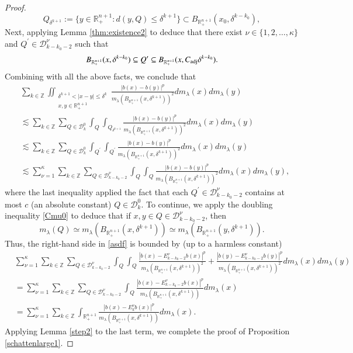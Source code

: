 \documentclass[12pt]{amsart}
\begin{document}
\begin{proof}
$$Q_{\delta^{k+1}}:=\{y\in\mathbb{R}_+^{n+1}:d(y,Q)\leq \delta^{k+1}\}\subset B_{\mathbb{R}_+^{n+1}}(x_0,\delta^{k-k_0}),$$
Next, applying Lemma \ref{thm:existence2} to deduce that there exist $\nu \in \{1, 2, \ldots, \kappa\}$ and
$Q^{\prime}\in\mathcal{D}_{k-k_0-2}^\nu$  such that
\begin{equation}\label{eq:ball;included}
    B_{\mathbb{R}_+^{n+1}}(x,\delta^{k-k_0})\subseteq Q^{\prime}\subseteq B_{\mathbb{R}_+^{n+1}}(x,C_{\rm adj}\delta^{k-k_0}).
\end{equation}
Combining with all the above facts, we conclude that
\begin{align}\label{asdf}
&\sum_{k\in\mathbb{Z}}\iint_{\substack{\delta^{k+1}<|x-y|\leq \delta^{k}\\x,y\in\mathbb{R}_{+}^{n+1}}}\frac{|b(x)-b(y)|^{p}}{m_\lambda(B_{\mathbb{R}_+^{n+1}}(x,\delta^{k+1}))^{2}}dm_\lambda(x)dm_\lambda(y)\nonumber\\
&\lesssim \sum_{k\in\mathbb{Z}}\sum_{Q\in\mathcal{D}_{k}^{0}}\int_Q\int_{Q_{\delta^{k+1}}}\frac{|b(x)-b(y)|^{p}}{m_\lambda(B_{\mathbb{R}_+^{n+1}}(x,\delta^{k+1}))^{2}}dm_\lambda(x)dm_\lambda(y)\nonumber\\
&\lesssim \sum_{k\in\mathbb{Z}}\sum_{Q\in\mathcal{D}_{k}^{0}}\int_{Q^\prime}\int_{Q^\prime}\frac{|b(x)-b(y)|^{p}}{m_\lambda(B_{\mathbb{R}_+^{n+1}}(x,\delta^{k+1}))^{2}}dm_\lambda(x)dm_\lambda(y)\nonumber\\
&\lesssim \sum_{\nu=1}^{\kappa} \sum_{k\in\mathbb{Z}}\sum_{Q\in\mathcal{D}_{k-k_0-2}^{\nu}}\int_{Q}\int_{Q}\frac{|b(x)-b(y)|^{p}}{m_\lambda(B_{\mathbb{R}_+^{n+1}}(x,\delta^{k+1}))^{2}}dm_\lambda(x)dm_\lambda(y),
\end{align}
where the last inequality applied the fact that each $Q^{\prime}\in \mathcal{D}_{k-k_0-2}^{\nu}$ contains at most $c$ (an absolute constant) $Q\in\mathcal{D}_{k}^{0}$.
To continue,  we apply the doubling inequality \eqref{Cmu0} to deduce that if $x,y\in Q\in\mathcal{D}_{k-k_0-2}^{\nu}$, then
$$m_\lambda(Q)\simeq m_\lambda(B_{\mathbb{R}_+^{n+1}}(x,\delta^{k+1}))\simeq m_\lambda(B_{\mathbb{R}_+^{n+1}}(y,\delta^{k+1})).$$
Thus,
 the right-hand side in \eqref{asdf} is bounded by (up to a harmless constant)
\begin{align*}
&\sum_{\nu=1}^{\kappa} \sum_{k\in\mathbb{Z}}\sum_{Q\in\mathcal{D}_{k-k_0-2}^{\nu}}\int_{Q}\int_{Q}\frac{|b(x)-E_{k-k_{0}-2}^{\nu}b(x)|^{p}}{m_\lambda(B_{\mathbb{R}_+^{n+1}}(x,\delta^{k+1}))^{2}}+\frac{|b(y)-E_{k-k_{0}-2}^{\nu}b(y)|^{p}}{m_\lambda(B_{\mathbb{R}_+^{n+1}}(x,\delta^{k+1}))^{2}}dm_\lambda(x)dm_\lambda(y)\\
&=\sum_{\nu=1}^{\kappa} \sum_{k\in\mathbb{Z}}\sum_{Q\in\mathcal{D}_{k-k_0-2}^{\nu}}\int_{Q}\frac{|b(x)-E_{k-k_{0}-2}^{\nu}b(x)|^{p}}{m_\lambda(B_{\mathbb{R}_+^{n+1}}(x,\delta^{k+1}))}dm_\lambda(x)\\
&= \sum_{\nu=1}^{\kappa} \sum_{k\in\mathbb{Z}}\int_{\mathbb{R}_{+}^{n+1}}\frac{|b(x)-E_{k}^{\nu}b(x)|^{p}}{m_\lambda(B_{\mathbb{R}_+^{n+1}}(x,\delta^{k+1}))}dm_\lambda(x).
\end{align*}
Applying Lemma \ref{step2} to the last term, we complete the proof of Proposition \ref{schattenlarge1}.
\end{proof}
\end{document}
